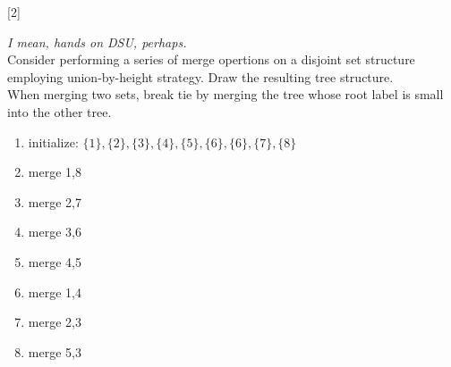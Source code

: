 [2]

\emph{I mean, hands on DSU, perhaps.}\\

Consider performing a series of merge opertions on a disjoint set structure employing union-by-height strategy.
Draw the resulting tree structure.\\
When merging two sets,
break tie by merging the tree whose root label is small into the other tree.

\newcommand{\SET}[1]{\{#1\}}

\begin{enumerate}[{\bf op} 1.]
	\item initialize: $\SET{1}, \SET{2}, \SET{3}, \SET{4}, \SET{5}, \SET{6}, \SET{6}, \SET{7}, \SET{8}$
	\item merge 1,8
	\item merge 2,7
	\item merge 3,6
	\item merge 4,5
	\item merge 1,4
	\item merge 2,3
	\item merge 5,3
\end{enumerate}

\begin{solution}
	\vspace{60ex}
\end{solution}
